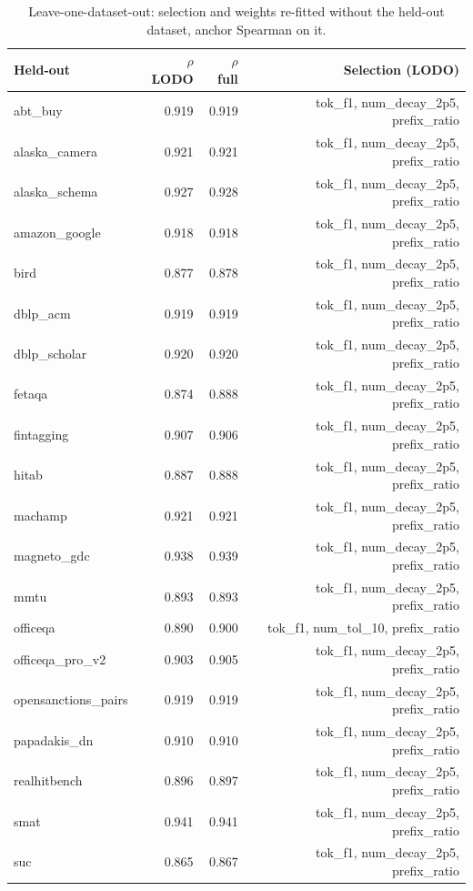 \begin{table}[t]
\centering
\footnotesize
\caption{Leave-one-dataset-out: selection and weights re-fitted without the held-out dataset, anchor Spearman on it.}
\label{tab:lodo}

\begin{tabular}{lrrr}
\toprule
Held-out & $\rho$ LODO & $\rho$ full & Selection (LODO) \\
\midrule
abt\_buy & 0.919 & 0.919 & tok\_f1, num\_decay\_2p5, prefix\_ratio \\
alaska\_camera & 0.921 & 0.921 & tok\_f1, num\_decay\_2p5, prefix\_ratio \\
alaska\_schema & 0.927 & 0.928 & tok\_f1, num\_decay\_2p5, prefix\_ratio \\
amazon\_google & 0.918 & 0.918 & tok\_f1, num\_decay\_2p5, prefix\_ratio \\
bird & 0.877 & 0.878 & tok\_f1, num\_decay\_2p5, prefix\_ratio \\
dblp\_acm & 0.919 & 0.919 & tok\_f1, num\_decay\_2p5, prefix\_ratio \\
dblp\_scholar & 0.920 & 0.920 & tok\_f1, num\_decay\_2p5, prefix\_ratio \\
fetaqa & 0.874 & 0.888 & tok\_f1, num\_decay\_2p5, prefix\_ratio \\
fintagging & 0.907 & 0.906 & tok\_f1, num\_decay\_2p5, prefix\_ratio \\
hitab & 0.887 & 0.888 & tok\_f1, num\_decay\_2p5, prefix\_ratio \\
machamp & 0.921 & 0.921 & tok\_f1, num\_decay\_2p5, prefix\_ratio \\
magneto\_gdc & 0.938 & 0.939 & tok\_f1, num\_decay\_2p5, prefix\_ratio \\
mmtu & 0.893 & 0.893 & tok\_f1, num\_decay\_2p5, prefix\_ratio \\
officeqa & 0.890 & 0.900 & tok\_f1, num\_tol\_10, prefix\_ratio \\
officeqa\_pro\_v2 & 0.903 & 0.905 & tok\_f1, num\_decay\_2p5, prefix\_ratio \\
opensanctions\_pairs & 0.919 & 0.919 & tok\_f1, num\_decay\_2p5, prefix\_ratio \\
papadakis\_dn & 0.910 & 0.910 & tok\_f1, num\_decay\_2p5, prefix\_ratio \\
realhitbench & 0.896 & 0.897 & tok\_f1, num\_decay\_2p5, prefix\_ratio \\
smat & 0.941 & 0.941 & tok\_f1, num\_decay\_2p5, prefix\_ratio \\
suc & 0.865 & 0.867 & tok\_f1, num\_decay\_2p5, prefix\_ratio \\

\end{tabular}
\end{table}
